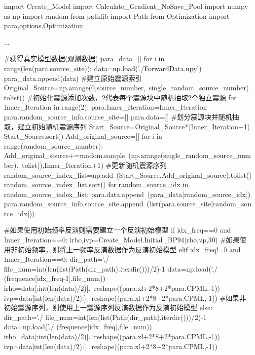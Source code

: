 \documentclass[12pt]{article}
\begin{document}
\begin{python}
import Create_Model
import Calculate_Gradient_NoSave_Pool
import numpy as np
import random
from pathlib import Path
from Optimization import para,options,Optimization

...

#获得真实模型数据(观测数据)
para_data=[]
for i in range(len(para.source_site)):
    data=np.load('./ForwardData.npy')
    para_data.append(data)
#建立原始震源索引
Original_Source=np.arange(0,source_number,\
single_random_source_number).tolist()
#初始化震源添加次数，2代表每个震源块中随机抽取2个独立震源
for Inner_Iteration in range(2):
    para.Inner_Iteration=Inner_Iteration
    para.random_source_info.source_site=[]
    para.data=[]
    #划分震源块并随机抽取，建立初始随机震源序列
    Start_Source=Original_Source*(Inner_Iteration+1)
    Start_Source.sort()
    Add_original_source=[]
    for i in range(random_source_number):
        Add_original_source+=random.sample\
        (np.arange(single_random_source_number).\
        tolist(),Inner_Iteration+1)
    #更新随机震源序列  
    random_source_index_list=np.add\
    (Start_Source,Add_original_source).tolist()
    random_source_index_list.sort()
    for random_source_idx in random_source_index_list:
        para.data.append\
        (para_data[random_source_idx])
        para.random_source_info.source_site.append\
        (list(para.source_site[random_source_idx]))
          
    #如果使用初始频率反演则需要建立一个反演初始模型
    if idx_freq==0 and Inner_Iteration==0:
        irho,ivp=Create_Model.Initial_BP94(rho,vp,30)
    #如果使用非初始频率，则将上一频率反演数据作为反演初始模型
    elif idx_freq!=0 and Inner_Iteration==0:
        dir_path='./%
        file_num=int(len(list(Path(dir_path).iterdir()))/2)-1
        data=np.load('./%
        (frequence[idx_freq-1],file_num))
        irho=data[:int(len(data)/2)].\
        reshape((para.xl+2*8+2*para.CPML,-1))
        ivp=data[int(len(data)/2):].\
        reshape((para.xl+2*8+2*para.CPML,-1))
    #如果非初始震源序列，则使用上一震源序列反演数据作为反演初始模型
    else:
        dir_path='./%
        file_num=int(len(list(Path(dir_path).iterdir()))/2)-1
        data=np.load('./%
        (frequence[idx_freq],file_num))
        irho=data[:int(len(data)/2)].\
        reshape((para.xl+2*8+2*para.CPML,-1))
        ivp=data[int(len(data)/2):].\
        reshape((para.xl+2*8+2*para.CPML,-1))


\end{python}
\end{document}
